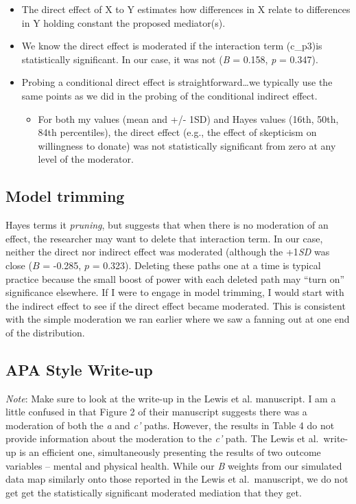 \documentclass[
  11pt,
]{book}
\providecommand{\tightlist}{%
  \setlength{\itemsep}{0pt}\setlength{\parskip}{0pt}}
\begin{document}
\begin{itemize}
\tightlist
\item
  The direct effect of X to Y estimates how differences in X relate to differences in Y holding constant the proposed mediator(s).
\item
  We know the direct effect is moderated if the interaction term (c\_p3)is statistically significant. In our case, it was not (\emph{B} = 0.158, \emph{p} = 0.347).
\item
  Probing a conditional direct effect is straightforward\ldots we typically use the same points as we did in the probing of the conditional indirect effect.

  \begin{itemize}
  \tightlist
  \item
    For both my values (mean and +/- 1SD) and Hayes values (16th, 50th, 84th percentiles), the direct effect (e.g., the effect of skepticism on willingness to donate) was not statistically significant from zero at any level of the moderator.
  \end{itemize}
\end{itemize}

\hypertarget{model-trimming}{%
\subsection{Model trimming}\label{model-trimming}}

Hayes terms it \emph{pruning}, but suggests that when there is no moderation of an effect, the researcher may want to delete that interaction term. In our case, neither the direct nor indirect effect was moderated (although the +1\emph{SD} was close (\(B\) = -0.285, \(p\) = 0.323). Deleting these paths one at a time is typical practice because the small boost of power with each deleted path may ``turn on'' significance elsewhere. If I were to engage in model trimming, I would start with the indirect effect to see if the direct effect became moderated. This is consistent with the simple moderation we ran earlier where we saw a fanning out at one end of the distribution.

\hypertarget{apa-style-write-up-1}{%
\subsection{APA Style Write-up}\label{apa-style-write-up-1}}

\emph{Note}: Make sure to look at the write-up in the Lewis et al. \citep{lewis_applying_2017} manuscript. I am a little confused in that Figure 2 of their manuscript suggests there was a moderation of both the \emph{a} and \emph{c'} paths. However, the results in Table 4 do not provide information about the moderation to the \emph{c'} path. The Lewis et al.~write-up is an efficient one, simultaneously presenting the results of two outcome variables -- mental and physical health. While our \emph{B} weights from our simulated data map similarly onto those reported in the Lewis et al.~manuscript, we do not get get the statistically significant moderated mediation that they get.
\end{document}
